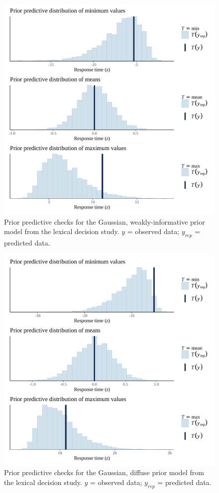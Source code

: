 \documentclass[
  12pt,
  man,floatsintext]{apa7}
\begin{document}
\begin{figure}

{\centering \includegraphics[width=0.8\linewidth]{../lexicaldecision/bayesian_analysis/prior_predictive_checks/plots/lexicaldecision_priorpredictivecheck_weaklyinformativepriors} 

}

\caption{Prior predictive checks for the Gaussian, weakly-informative prior model from the lexical decision study. \(y\) = observed data; \(y_{rep}\) = predicted data.}\label{fig:lexicaldecision-priorpredictivecheck-weaklyinformativepriors}
\end{figure}



\begin{figure}

{\centering \includegraphics[width=0.8\linewidth]{../lexicaldecision/bayesian_analysis/prior_predictive_checks/plots/lexicaldecision_priorpredictivecheck_diffusepriors} 

}

\caption{Prior predictive checks for the Gaussian, diffuse prior model from the lexical decision study. \(y\) = observed data; \(y_{rep}\) = predicted data.}\label{fig:lexicaldecision-priorpredictivecheck-diffusepriors}
\end{figure}
\end{document}
